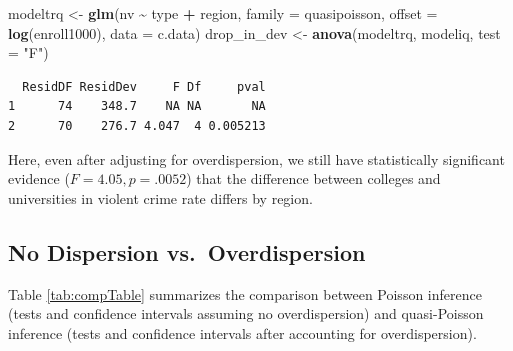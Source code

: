 \documentclass[
]{krantz}
\newenvironment{Shaded}{\begin{snugshade}}{\end{snugshade}}
\newcommand{\AttributeTok}[1]{\textcolor[rgb]{0.27,0.27,0.27}{#1}}
\newcommand{\FunctionTok}[1]{\textcolor[rgb]{0.27,0.27,0.27}{\textbf{#1}}}
\newcommand{\NormalTok}[1]{#1}
\newcommand{\OtherTok}[1]{\textcolor[rgb]{0.37,0.37,0.37}{#1}}
\newcommand{\SpecialCharTok}[1]{\textcolor[rgb]{0.43,0.43,0.43}{\textbf{#1}}}
\newcommand{\StringTok}[1]{\textcolor[rgb]{0.5,0.5,0.5}{#1}}
\begin{document}
\begin{Shaded}
\begin{Highlighting}[]
\NormalTok{modeltrq }\OtherTok{\textless{}{-}} \FunctionTok{glm}\NormalTok{(nv }\SpecialCharTok{\textasciitilde{}}\NormalTok{ type }\SpecialCharTok{+}\NormalTok{ region, }\AttributeTok{family =}\NormalTok{ quasipoisson,}
               \AttributeTok{offset =} \FunctionTok{log}\NormalTok{(enroll1000), }\AttributeTok{data =}\NormalTok{ c.data)}
\NormalTok{drop\_in\_dev }\OtherTok{\textless{}{-}} \FunctionTok{anova}\NormalTok{(modeltrq, modeliq, }\AttributeTok{test =} \StringTok{"F"}\NormalTok{)}
\end{Highlighting}
\end{Shaded}

\begin{verbatim}
  ResidDF ResidDev     F Df     pval
1      74    348.7    NA NA       NA
2      70    276.7 4.047  4 0.005213
\end{verbatim}

Here, even after adjusting for overdispersion, we still have statistically significant evidence (\(F=4.05, p=.0052\)) that the difference between colleges and universities in violent crime rate differs by region.

\subsection{No Dispersion vs.~Overdispersion}\label{no-dispersion-vs.-overdispersion}

Table \ref{tab:compTable} summarizes the comparison between Poisson inference (tests and confidence intervals assuming no overdispersion) and quasi-Poisson inference (tests and confidence intervals after accounting for overdispersion).

\begin{table}
\centering
\caption{\label{tab:compTable}Comparison of Poisson and quasi-Poisson inference.}
\centering
{}
\end{table}
\end{document}
